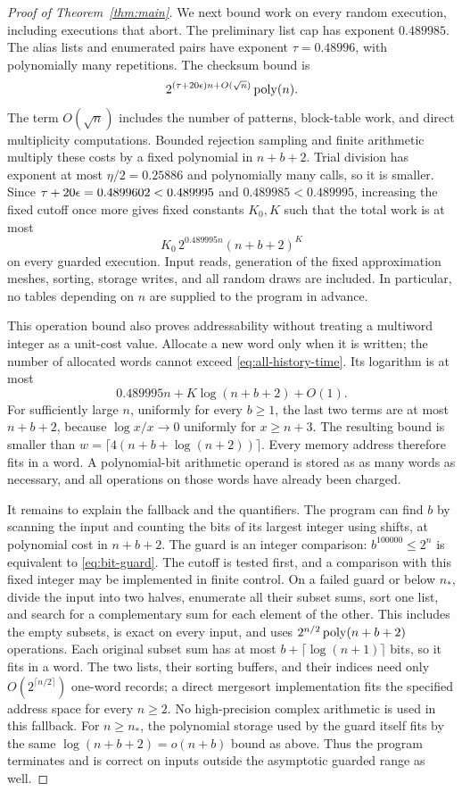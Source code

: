 \begin{proof}[Proof of Theorem~\ref{thm:main}]
We next bound work on every random execution, including executions that
abort.  The preliminary list cap has exponent $0.489985$.  The alias
lists and enumerated pairs have exponent $\tau=0.48996$, with
polynomially many repetitions.  The checksum bound is
\[
 2^{(\tau+20\epsilon)n+O(\sqrt n)}\operatorname{poly}(n).
\]
The term $O(\sqrt n)$ includes the number of patterns, block-table work,
and direct multiplicity computations.  Bounded rejection sampling and
finite arithmetic multiply these costs by a fixed polynomial in
$n+b+2$.  Trial division has exponent at most
$\eta/2=0.25886$ and polynomially many calls, so it is smaller.  Since
$\tau+20\epsilon=0.4899602<0.489995$ and
$0.489985<0.489995$, increasing the fixed cutoff once more gives fixed
constants $K_0,K$ such that the total work is at most
\begin{equation}
 K_0\,2^{0.489995n}(n+b+2)^K
 \label{eq:all-history-time}
\end{equation}
on every guarded execution.  Input reads, generation of the fixed
approximation meshes, sorting, storage writes, and all random draws are
included.  In particular, no tables depending on $n$ are supplied to the
program in advance.

This operation bound also proves addressability without treating a
multiword integer as a unit-cost value.  Allocate a new word only when it
is written; the number of allocated words cannot exceed
\eqref{eq:all-history-time}.  Its logarithm is at most
\[
 0.489995n+K\log(n+b+2)+O(1).
\]
For sufficiently large $n$, uniformly for every $b\ge1$, the last two
terms are at most $n+b+2$, because $\log x/x\to0$ uniformly for
$x\ge n+3$.  The resulting bound is smaller than
$w=\lceil4(n+b+\log(n+2))\rceil$.  Every memory address therefore fits
in a word.  A polynomial-bit arithmetic operand is stored as as many
words as necessary, and all operations on those words have already been
charged.

It remains to explain the fallback and the quantifiers.  The program can
find $b$ by scanning the input and counting the bits of its largest
integer using shifts, at polynomial cost in $n+b+2$.  The guard is an
integer comparison: $b^{100000}\le2^n$ is equivalent to
\eqref{eq:bit-guard}.  The cutoff is tested first, and a comparison with
this fixed integer may be implemented in finite control.  On a failed
guard or below $n_*$, divide the input
into two halves, enumerate all their subset sums, sort one list, and
search for a complementary sum for each element of the other.  This
includes the empty subsets, is exact on every input, and uses
$2^{n/2}\operatorname{poly}(n+b+2)$ operations.  Each original subset sum has at most
$b+\lceil\log(n+1)\rceil$ bits, so it fits in a word.  The two lists,
their sorting buffers, and their indices need only
$O(2^{\lceil n/2\rceil})$ one-word records; a direct mergesort implementation
fits the specified address space for every $n\ge2$.  No high-precision
complex arithmetic is used in this fallback.  For $n\ge n_*$, the
polynomial storage used by the guard itself fits by the same
$\log(n+b+2)=o(n+b)$ bound as above.  Thus the program terminates and is
correct on inputs outside the asymptotic guarded range as well.


\end{proof}
